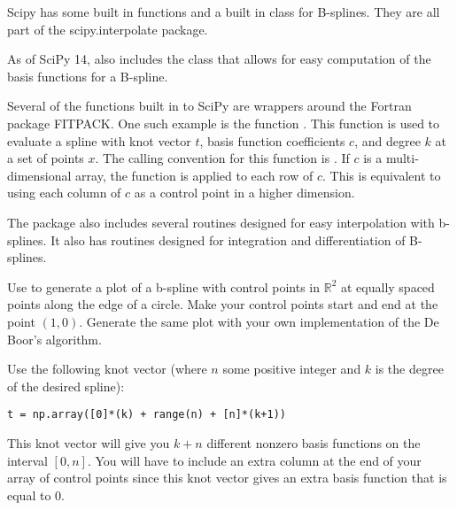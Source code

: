 Scipy has some built in functions and a built in class for B-splines.
They are all part of the scipy.interpolate package.

As of SciPy 14,  also includes the  class that allows for easy computation of the basis functions for a B-spline.

Several of the functions built in to SciPy are wrappers around the Fortran package FITPACK.
One such example is the function .
This function is used to evaluate a spline with knot vector $t$, basis function coefficients $c$, and degree $k$ at a set of points $x$.
The calling convention for this function is .
If $c$ is a multi-dimensional array, the function is applied to each row of $c$.
This is equivalent to using each column of $c$ as a control point in a higher dimension.

The package  also includes several routines designed for easy interpolation with b-splines.
It also has routines designed for integration and differentiation of B-splines.

\begin{problem}
Use  to generate a plot of a b-spline with control points in $\mathbb{R}^2$ at equally spaced points along the edge of a circle.
Make your control points start and end at the point $\left(1, 0\right)$.
Generate the same plot with your own implementation of the De Boor's algorithm.

Use the following knot vector (where $n$ some positive integer and $k$ is the degree of the desired spline):
\begin{lstlisting}
t = np.array([0]*(k) + range(n) + [n]*(k+1))
\end{lstlisting}
This knot vector will give you $k + n$ different nonzero basis functions on the interval $\left[0, n\right]$.
You will have to include an extra column at the end of your array of control points since this knot vector gives an extra basis function that is equal to $0$.
\end{problem}
